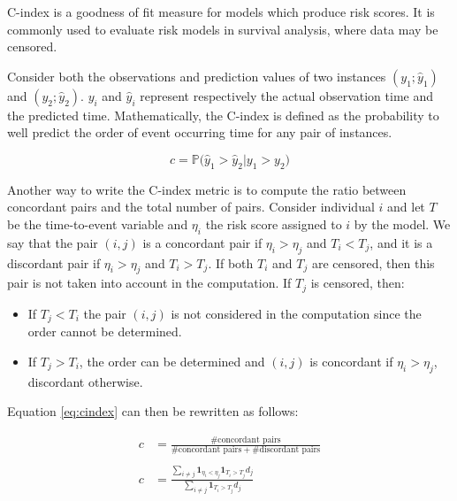\documentclass[
]{book}
\providecommand{\tightlist}{%
  \setlength{\itemsep}{0pt}\setlength{\parskip}{0pt}}
\begin{document}
C-index is a goodness of fit measure for models which produce risk scores. It is commonly used to evaluate risk models in survival analysis, where data may be censored.

Consider both the observations and prediction values of two instances \((y_1; \hat{y}_1)\) and \((y_2; \hat{y}_2)\). \(y_i\) and \(\hat{y}_i\) represent respectively the actual observation time and the predicted time. Mathematically, the C-index is defined as the probability to well predict the order of event occurring time for any pair of instances.

\begin{equation}
  c = \mathbb{P}\big(\hat{y}_1 > \hat{y}_2 | y_1 > y_2\big)
  \label{eq:cindex}
\end{equation}

Another way to write the C-index metric is to compute the ratio between concordant pairs and the total number of pairs. Consider individual \(i\) and let \(T\) be the time-to-event variable and \(\eta_i\) the risk score assigned to \(i\) by the model. We say that the pair \((i, j)\) is a concordant pair if \(\eta_i > \eta_j\) and \(T_i < T_j\), and it is a discordant pair if \(\eta_i > \eta_j\) and \(T_i > T_j\). If both \(T_i\) and \(T_j\) are censored, then this pair is not taken into account in the computation. If \(T_j\) is censored, then:

\begin{itemize}
\tightlist
\item
  If \(T_j < T_i\) the pair \((i, j)\) is not considered in the computation since the order cannot be determined.
\item
  If \(T_j > T_i\), the order can be determined and \((i, j)\) is concordant if \(\eta_i > \eta_j\), discordant otherwise.
\end{itemize}

Equation \eqref{eq:cindex} can then be rewritten as follows:

\begin{equation}
\begin{aligned}
c & = \frac{\# \text{concordant pairs}}{\# \text{concordant pairs} + \# \text{discordant pairs}} \\\\
c & = \frac{\sum_{i \neq j} \pmb{1}_{\eta_i < \eta_j} \pmb{1}_{T_i > T_j}d_j}{\sum_{i \neq j} \pmb{1}_{T_i > T_j}d_j}
\end{aligned}
\label{eq:cindex2}
\end{equation}
\end{document}
